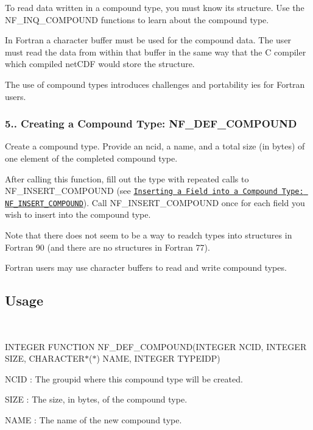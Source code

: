 To read data written in a compound type, you must know its structure. Use the N\+F\+\_\+\+I\+N\+Q\+\_\+\+C\+O\+M\+P\+O\+U\+ND functions to learn about the compound type.

In Fortran a character buffer must be used for the compound data. The user must read the data from within that buffer in the same way that the C compiler which compiled net\+C\+DF would store the structure.

The use of compound types introduces challenges and portability ies for Fortran users.\hypertarget{nc_f77_interface_guide_f77_NF-DEF-COMPOUND}{}\subsubsection{5.. Creating a Compound Type\+: N\+F\+\_\+\+D\+E\+F\+\_\+\+C\+O\+M\+P\+O\+U\+ND}\label{nc_f77_interface_guide_f77_NF-DEF-COMPOUND}
Create a compound type. Provide an ncid, a name, and a total size (in bytes) of one element of the completed compound type.

After calling this function, fill out the type with repeated calls to N\+F\+\_\+\+I\+N\+S\+E\+R\+T\+\_\+\+C\+O\+M\+P\+O\+U\+ND (see \href{#NF_005fINSERT_005fCOMPOUND}{\tt Inserting a Field into a Compound Type\+: N\+F\+\_\+\+I\+N\+S\+E\+R\+T\+\_\+\+C\+O\+M\+P\+O\+U\+ND}). Call N\+F\+\_\+\+I\+N\+S\+E\+R\+T\+\_\+\+C\+O\+M\+P\+O\+U\+ND once for each field you wish to insert into the compound type.

Note that there does not seem to be a way to readch types into structures in Fortran 90 (and there are no structures in Fortran 77).

Fortran users may use character buffers to read and write compound types.

\subsection*{Usage }

 

I\+N\+T\+E\+G\+ER F\+U\+N\+C\+T\+I\+ON N\+F\+\_\+\+D\+E\+F\+\_\+\+C\+O\+M\+P\+O\+U\+ND(I\+N\+T\+E\+G\+ER N\+C\+ID, I\+N\+T\+E\+G\+ER S\+I\+ZE, C\+H\+A\+R\+A\+C\+T\+E\+R$\ast$($\ast$) N\+A\+ME, I\+N\+T\+E\+G\+ER T\+Y\+P\+E\+I\+DP)

{\ttfamily N\+C\+ID} \+: The groupid where this compound type will be created.

{\ttfamily S\+I\+ZE} \+: The size, in bytes, of the compound type.

{\ttfamily N\+A\+ME} \+: The name of the new compound type.

